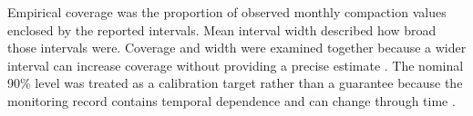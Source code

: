 Empirical coverage was the proportion of observed monthly compaction values enclosed by the reported intervals. Mean interval width described how broad those intervals were. Coverage and width were examined together because a wider interval can increase coverage without providing a precise estimate \citep{singh_uncertainty_2024}. The nominal 90\% level was treated as a calibration target rather than a guarantee because the monitoring record contains temporal dependence and can change through time \citep{zaffran_adaptive_2022}.

%
%
